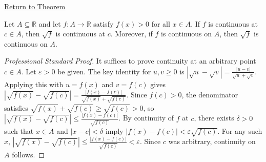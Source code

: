 \newpage
{}
\label{prf:square-root-preserves-continuity}

\begin{remark*}[Return]
\hyperref[thm:square-root-preserves-continuity]{Return to Theorem}
\end{remark*}

\begin{theorem*}
Let $A \subseteq \mathbb{R}$ and let $f \colon A \to \mathbb{R}$ satisfy $f(x) > 0$ for all $x \in A$. If $f$ is continuous at $c \in A$, then $\sqrt{f}$ is continuous at $c$. Moreover, if $f$ is continuous on $A$, then $\sqrt{f}$ is continuous on $A$.
\end{theorem*}

\begin{proof}[Professional Standard Proof]
\LRAProofBodyStart
It suffices to prove continuity at an arbitrary point $c \in A$. Let $\varepsilon > 0$ be given. The key identity for $u, v \geq 0$ is $|\sqrt{u} - \sqrt{v}| = \frac{|u - v|}{\sqrt{u} + \sqrt{v}}$. Applying this with $u = f(x)$ and $v = f(c)$ gives $|\sqrt{f(x)} - \sqrt{f(c)}| = \frac{|f(x) - f(c)|}{\sqrt{f(x)} + \sqrt{f(c)}}$. Since $f(c) > 0$, the denominator satisfies $\sqrt{f(x)} + \sqrt{f(c)} \geq \sqrt{f(c)} > 0$, so $|\sqrt{f(x)} - \sqrt{f(c)}| \leq \frac{|f(x) - f(c)|}{\sqrt{f(c)}}$. By continuity of $f$ at $c$, there exists $\delta > 0$ such that $x \in A$ and $|x - c| < \delta$ imply $|f(x) - f(c)| < \varepsilon\sqrt{f(c)}$. For any such $x$, $|\sqrt{f(x)} - \sqrt{f(c)}| \leq \frac{|f(x) - f(c)|}{\sqrt{f(c)}} < \varepsilon$. Since $c$ was arbitrary, continuity on $A$ follows.
\end{proof}

